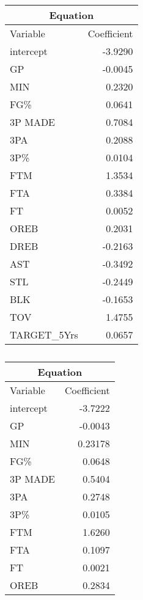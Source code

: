 \begin{table}[H]
	\begin{subtable}[h]{0.4\textwidth}
		\centering
		\begin{tabular}{|| l | r ||} 
			\hline
			\multicolumn{2}{|c|}{Equation} \\
			\hline
			Variable & Coefficient \\
			\hline
			intercept & -3.9290 \\
			GP & -0.0045 \\
			MIN & 0.2320 \\
			FG\% & 0.0641 \\
			3P MADE & 0.7084 \\
			3PA & 0.2088 \\
			3P\% & 0.0104 \\
			FTM & 1.3534 \\
			FTA & 0.3384 \\
			FT & 0.0052 \\
			OREB & 0.2031 \\
			DREB & -0.2163 \\
			AST & -0.3492 \\			
			STL & -0.2449 \\
			BLK & -0.1653 \\
			TOV & 1.4755 \\
			TARGET\_5Yrs & 0.0657 \\				
			\hline
		\end{tabular}
		\caption{}
		\label{table:FinalRidgeCoef}
	\end{subtable}
	\hfill
	\begin{subtable}[h]{0.4\textwidth}
		\centering
		\begin{tabular}{|| l | r ||} 
			\hline
			\multicolumn{2}{|c|}{Equation} \\
			\hline
			Variable & Coefficient \\
			\hline
			intercept & -3.7222 \\
			GP & -0.0043 \\
			MIN & 0.23178 \\
			FG\% & 0.0648 \\ 
			3P MADE & 0.5404 \\ 
			3PA & 0.2748 \\ 
			3P\% & 0.0105 \\
			FTM & 1.6260 \\ 
			FTA & 0.1097 \\ 
			FT & 0.0021 \\ 
			OREB & 0.2834 \\ 

\end{tabular}
\end{subtable}
\end{table}
